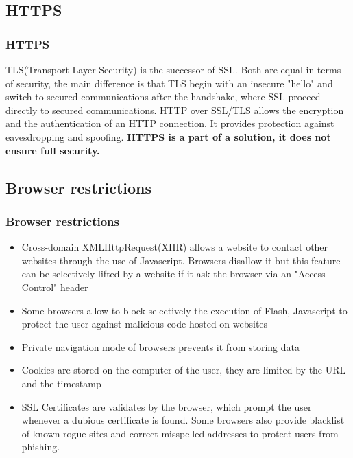 \subsection{HTTPS}
\begin{frame}
\frametitle{HTTPS}
TLS(Transport Layer Security) is the successor of SSL. Both are equal in terms of security, the main difference is that TLS begin with an insecure "hello" and switch to secured communications after the handshake, where SSL proceed directly to secured communications.\linebreak
HTTP over SSL/TLS allows the encryption and the authentication of an HTTP connection. It provides protection against eavesdropping and spoofing.\linebreak 
\textbf{HTTPS is a part of a solution, it does not ensure full security. }
\end{frame}

\subsection{Browser restrictions}
\begin{frame}
\frametitle{Browser restrictions}
\begin{itemize}
\item Cross-domain XMLHttpRequest(XHR) allows a website to contact other websites through the use of Javascript. Browsers disallow it but this feature can be selectively lifted by a website if it ask the browser via an "Access Control" header
\item Some browsers allow to block selectively the execution of Flash, Javascript to protect the user against malicious code hosted on websites
\end{itemize}
\end{frame}
\begin{frame}
\begin{itemize}
\item Private navigation mode of browsers prevents it from storing data
\item Cookies are stored on the computer of the user, they are limited by the URL and the timestamp
\item SSL Certificates are validates by the browser, which prompt the user whenever a dubious certificate is found. Some browsers also provide blacklist of known rogue sites and correct misspelled addresses to protect users from phishing.
\end{itemize}
\end{frame}

